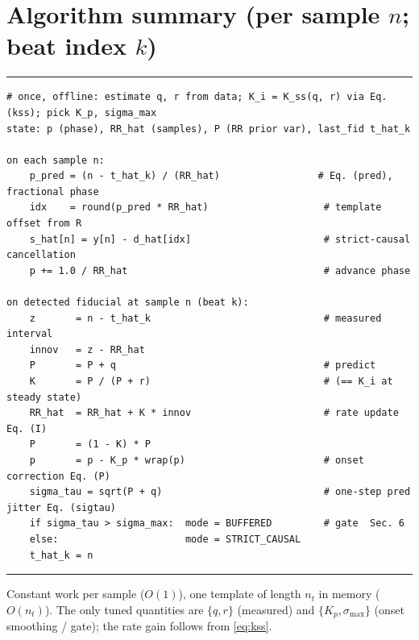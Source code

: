 \documentclass[11pt]{article}
\begin{document}
\section*{Algorithm summary (per sample $n$; beat index $k$)}
\hrule\vspace{4pt}
\begin{small}
\begin{verbatim}
# once, offline: estimate q, r from data; K_i = K_ss(q, r) via Eq. (kss); pick K_p, sigma_max
state: p (phase), RR_hat (samples), P (RR prior var), last_fid t_hat_k

on each sample n:
    p_pred = (n - t_hat_k) / (RR_hat)                 # Eq. (pred), fractional phase
    idx    = round(p_pred * RR_hat)                    # template offset from R
    s_hat[n] = y[n] - d_hat[idx]                       # strict-causal cancellation
    p += 1.0 / RR_hat                                  # advance phase

on detected fiducial at sample n (beat k):
    z       = n - t_hat_k                              # measured interval
    innov   = z - RR_hat
    P       = P + q                                    # predict
    K       = P / (P + r)                              # (== K_i at steady state)
    RR_hat  = RR_hat + K * innov                       # rate update  Eq. (I)
    P       = (1 - K) * P
    p       = p - K_p * wrap(p)                        # onset correction Eq. (P)
    sigma_tau = sqrt(P + q)                            # one-step pred jitter Eq. (sigtau)
    if sigma_tau > sigma_max:  mode = BUFFERED         # gate  Sec. 6
    else:                      mode = STRICT_CAUSAL
    t_hat_k = n
\end{verbatim}
\end{small}
\hrule
\vspace{4pt}
\noindent
Constant work per sample ($O(1)$), one template of length $n_t$ in memory ($O(n_t)$). The only tuned
quantities are $\{q,r\}$ (measured) and $\{K_p,\sigma_{\max}\}$ (onset smoothing / gate); the rate
gain follows from \eqref{eq:kss}.
\end{document}
